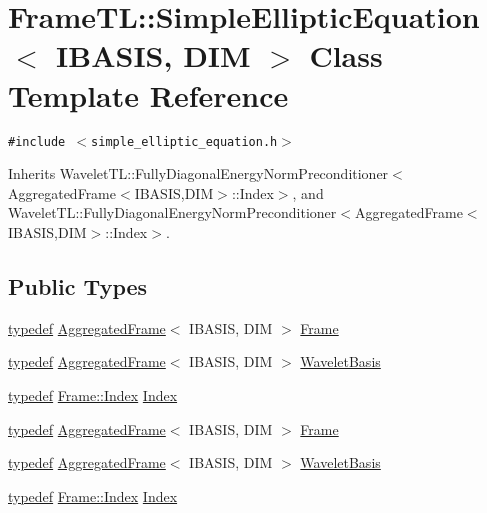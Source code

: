 \hypertarget{classFrameTL_1_1SimpleEllipticEquation}{
\section{FrameTL::SimpleEllipticEquation$<$ IBASIS, DIM $>$ Class Template Reference}
\label{classFrameTL_1_1SimpleEllipticEquation}
}
{\tt \#include $<$simple\_\-elliptic\_\-equation.h$>$}

Inherits WaveletTL::FullyDiagonalEnergyNormPreconditioner$<$AggregatedFrame$<$IBASIS,DIM$>$::Index$>$, and WaveletTL::FullyDiagonalEnergyNormPreconditioner$<$AggregatedFrame$<$IBASIS,DIM$>$::Index$>$.

\subsection*{Public Types}
\begin{CompactItemize}
\item 
\hyperlink{structtypedef}{typedef} \hyperlink{classFrameTL_1_1AggregatedFrame}{AggregatedFrame}$<$ IBASIS, DIM $>$ \hyperlink{classFrameTL_1_1SimpleEllipticEquation_b048afa8f64d6e76d33b1ae60686010a}{Frame}
\item 
\hyperlink{structtypedef}{typedef} \hyperlink{classFrameTL_1_1AggregatedFrame}{AggregatedFrame}$<$ IBASIS, DIM $>$ \hyperlink{classFrameTL_1_1SimpleEllipticEquation_59ee36b9fe6e6aab5b0947de8487c95e}{WaveletBasis}
\item 
\hyperlink{structtypedef}{typedef} \hyperlink{classFrameTL_1_1FrameIndex}{Frame::Index} \hyperlink{classFrameTL_1_1SimpleEllipticEquation_763214b72b98926356eebe8b7f6da678}{Index}
\item 
\hyperlink{structtypedef}{typedef} \hyperlink{classFrameTL_1_1AggregatedFrame}{AggregatedFrame}$<$ IBASIS, DIM $>$ \hyperlink{classFrameTL_1_1SimpleEllipticEquation_b048afa8f64d6e76d33b1ae60686010a}{Frame}
\item 
\hyperlink{structtypedef}{typedef} \hyperlink{classFrameTL_1_1AggregatedFrame}{AggregatedFrame}$<$ IBASIS, DIM $>$ \hyperlink{classFrameTL_1_1SimpleEllipticEquation_59ee36b9fe6e6aab5b0947de8487c95e}{WaveletBasis}
\item 
\hyperlink{structtypedef}{typedef} \hyperlink{classFrameTL_1_1FrameIndex}{Frame::Index} \hyperlink{classFrameTL_1_1SimpleEllipticEquation_763214b72b98926356eebe8b7f6da678}{Index}
\end{CompactItemize}
